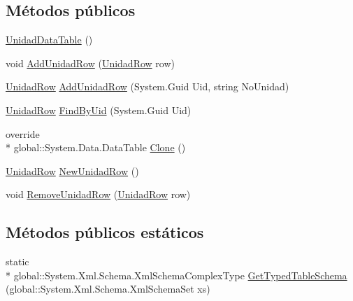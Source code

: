 \subsection*{Métodos públicos}
\begin{DoxyCompactItemize}
\item 
\hyperlink{class_proyecto___integrador__3_1_1ds_unidad_1_1_unidad_data_table_a902e2c4a83f45abc191d89c7ab641896}{Unidad\-Data\-Table} ()
\item 
void \hyperlink{class_proyecto___integrador__3_1_1ds_unidad_1_1_unidad_data_table_a5739e11efa450213d787799fb3420405}{Add\-Unidad\-Row} (\hyperlink{class_proyecto___integrador__3_1_1ds_unidad_1_1_unidad_row}{Unidad\-Row} row)
\item 
\hyperlink{class_proyecto___integrador__3_1_1ds_unidad_1_1_unidad_row}{Unidad\-Row} \hyperlink{class_proyecto___integrador__3_1_1ds_unidad_1_1_unidad_data_table_a337704d4e273543a0fd2f7d55c56f509}{Add\-Unidad\-Row} (System.\-Guid Uid, string No\-Unidad)
\item 
\hyperlink{class_proyecto___integrador__3_1_1ds_unidad_1_1_unidad_row}{Unidad\-Row} \hyperlink{class_proyecto___integrador__3_1_1ds_unidad_1_1_unidad_data_table_a845301b4eac74689bc5aa7d5fd96960e}{Find\-By\-Uid} (System.\-Guid Uid)
\item 
override \\*
global\-::\-System.\-Data.\-Data\-Table \hyperlink{class_proyecto___integrador__3_1_1ds_unidad_1_1_unidad_data_table_ad05b8bb64ff5dd063bfc497a04b6626a}{Clone} ()
\item 
\hyperlink{class_proyecto___integrador__3_1_1ds_unidad_1_1_unidad_row}{Unidad\-Row} \hyperlink{class_proyecto___integrador__3_1_1ds_unidad_1_1_unidad_data_table_accab78f269110a6a3c778976369510a8}{New\-Unidad\-Row} ()
\item 
void \hyperlink{class_proyecto___integrador__3_1_1ds_unidad_1_1_unidad_data_table_a611c6e38ae648c0c130e2f487ca3cded}{Remove\-Unidad\-Row} (\hyperlink{class_proyecto___integrador__3_1_1ds_unidad_1_1_unidad_row}{Unidad\-Row} row)
\end{DoxyCompactItemize}
\subsection*{Métodos públicos estáticos}
\begin{DoxyCompactItemize}
\item 
static \\*
global\-::\-System.\-Xml.\-Schema.\-Xml\-Schema\-Complex\-Type \hyperlink{class_proyecto___integrador__3_1_1ds_unidad_1_1_unidad_data_table_a0e24c87b3ec974d76fec0a587265edf3}{Get\-Typed\-Table\-Schema} (global\-::\-System.\-Xml.\-Schema.\-Xml\-Schema\-Set xs)
\end{DoxyCompactItemize}
